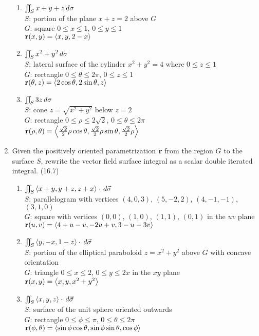 \begin{enumerate}
      \begin{enumerate}
        \item 
          $\iint_S x+y+z\,d{\sigma}$\\
          $S$: portion of the plane $x+z=2$ above $G$\\
          $G$: square $0\leq x\leq 1$, $0\leq y\leq 1$\\
          $\mathbf{r}(x,y)=\left<x,y,2-x\right>$
        \item
          $\iint_S x^2+y^2\,d{\sigma}$\\
          $S$: lateral surface of the cylinder $x^2+y^2=4$ where $0\leq z\leq 1$\\
          $G$: rectangle $0\leq \theta\leq 2\pi$, $0\leq z\leq 1$\\
          $\mathbf{r}(\theta,z)=\left<2\cos\theta,2\sin\theta,z\right>$
        \item
          $\iint_S 3z\,d{\sigma}$\\
          $S$: cone $z=\sqrt{x^2+y^2}$ below $z=2$\\
          $G$: rectangle $0\leq\rho\leq 2\sqrt{2}$, $0\leq\theta\leq 2\pi$\\
          $\mathbf{r}(\rho,\theta)=\left<\frac{\sqrt{2}}{2}\rho\cos\theta,\frac{\sqrt{2}}{2}\rho\sin\theta,\frac{\sqrt{2}}{2}\rho\right>$
      \end{enumerate}

    \newpage

    \item Given the positively oriented parametrization $\mathbf{r}$ from the region $G$ to the surface $S$, rewrite the vector field surface integral as a scalar double iterated integral. (16.7)

      \begin{enumerate}
        \item
          $\iint_S \left<x+y,y+z,z+x\right>\cdot\,d{\vec\sigma}$\\
          $S$: parallelogram with vertices $(4,0,3)$, $(5,-2,2)$, $(4,-1,-1)$, $(3,1,0)$\\
          $G$: square with vertices $(0,0)$, $(1,0)$, $(1,1)$, $(0,1)$ in the $uv$ plane\\
          $\mathbf{r}(u,v) = \left< 4+u-v, -2u+v, 3-u-3v\right>$
        \item
          $\iint_S \left<y,-x,1-z\right>\cdot\,d{\vec{\sigma}}$\\
          $S$: portion of the elliptical paraboloid $z=x^2+y^2$ above $G$ with concave orientation\\
          $G$: triangle $0\leq x\leq 2$, $0\leq y\leq 2x$ in the $xy$ plane\\
          $\mathbf{r}(x,y)=\left<x,y,x^2+y^2\right>$
        \item 
          $\iint_S \left<x,y,z\right>\cdot\,d{\vec{\sigma}}$\\
          $S$: surface of the unit sphere oriented outwards\\
          $G$: rectangle $0\leq\phi\leq\pi$, $0\leq\theta\leq2\pi$\\
          $\mathbf{r}(\phi,\theta) = \left< \sin\phi\cos\theta, \sin\phi\sin\theta, \cos\phi \right>$
      \end{enumerate}


\end{enumerate}

